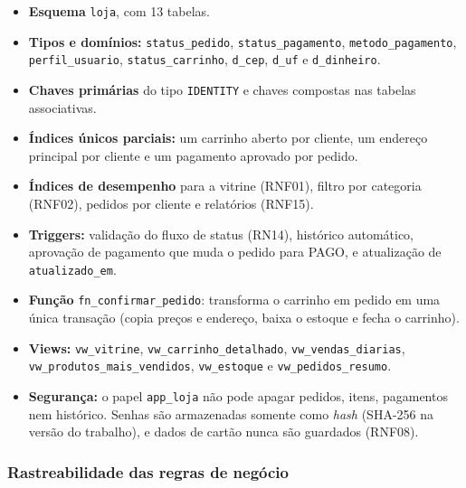 \documentclass[12pt]{article}
\begin{document}
\begin{itemize}
\item \textbf{Esquema} \texttt{loja}, com 13 tabelas.
\item \textbf{Tipos e domínios:} \texttt{status\_pedido}, \texttt{status\_pagamento}, \texttt{metodo\_pagamento}, \texttt{perfil\_usuario}, \texttt{status\_carrinho}, \texttt{d\_cep}, \texttt{d\_uf} e \texttt{d\_dinheiro}.
\item \textbf{Chaves primárias} do tipo \texttt{IDENTITY} e chaves compostas nas tabelas associativas.
\item \textbf{Índices únicos parciais:} um carrinho aberto por cliente, um endereço principal por cliente e um pagamento aprovado por pedido.
\item \textbf{Índices de desempenho} para a vitrine (RNF01), filtro por categoria (RNF02), pedidos por cliente e relatórios (RNF15).
\item \textbf{Triggers:} validação do fluxo de status (RN14), histórico automático, aprovação de pagamento que muda o pedido para PAGO, e atualização de \texttt{atualizado\_em}.
\item \textbf{Função} \texttt{fn\_confirmar\_pedido}: transforma o carrinho em pedido em uma única transação (copia preços e endereço, baixa o estoque e fecha o carrinho).
\item \textbf{Views:} \texttt{vw\_vitrine}, \texttt{vw\_carrinho\_detalhado}, \texttt{vw\_vendas\_diarias}, \texttt{vw\_produtos\_mais\_vendidos}, \texttt{vw\_estoque} e \texttt{vw\_pedidos\_resumo}.
\item \textbf{Segurança:} o papel \texttt{app\_loja} não pode apagar pedidos, itens, pagamentos nem histórico. Senhas são armazenadas somente como \textit{hash} (SHA-256 na versão do trabalho), e dados de cartão nunca são guardados (RNF08).
\end{itemize}

\subsubsection{Rastreabilidade das regras de negócio}
\end{document}
